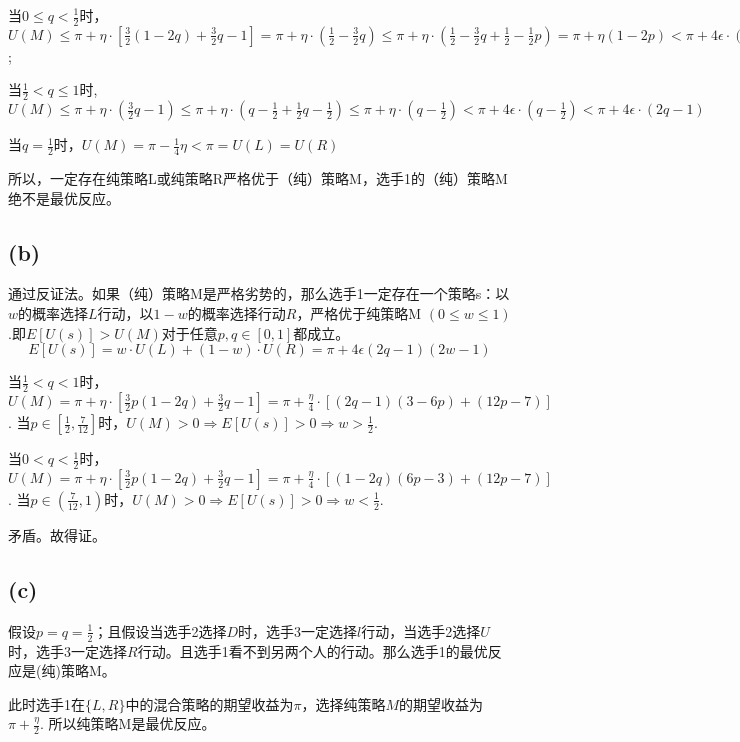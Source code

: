 \documentclass[11pt,fleqn]{article}
\begin{document}
		当$0\leq q < \frac{1}{2} $时，$U(M) \leq \pi + \eta \cdot [ \frac{3}{2}(1-2q)+\frac{3}{2}q-1 ]= \pi + \eta \cdot (\frac{1}{2} - \frac{3}{2}q)\leq \pi + \eta \cdot (\frac{1}{2} - \frac{3}{2}q + \frac{1}{2} - \frac{1}{2}p) = \pi + \eta (1-2p) < \pi + 4\epsilon \cdot (1-2q) = U(R) $; 

		当$ \frac{1}{2} < q \leq 1$时, $U(M) \leq \pi + \eta \cdot (\frac{3}{2}q -1) \leq \pi + \eta \cdot (q-\frac{1}{2} + \frac{1}{2}q-\frac{1}{2}) \leq \pi + \eta \cdot (q-\frac{1}{2}) 
		< \pi + 4\epsilon \cdot (q-\frac{1}{2})
		< \pi + 4\epsilon \cdot (2q-1)$

		当$q=\frac{1}{2}$时，$U(M) = \pi - \frac{1}{4}\eta < \pi = U(L)=U(R) $

		所以，一定存在纯策略L或纯策略R严格优于（纯）策略M，选手1的（纯）策略M绝不是最优反应。
	\subsection*{(b)}
		通过反证法。如果（纯）策略M是严格劣势的，那么选手1一定存在一个策略s：以$w$的概率选择$L$行动，以$1-w$的概率选择行动$R$，严格优于纯策略M $(0\leq w \leq 1)$.即$E[U(s)] > U(M) $对于任意$p,q \in [0,1]$都成立。
		\begin{displaymath}
			E[U(s)]= w\cdot U(L)+ (1-w)\cdot U(R) = \pi + 4\epsilon(2q-1)(2w-1)
		\end{displaymath}

		当$\frac{1}{2} < q < 1$时，$U(M) 
		= \pi + \eta\cdot [\frac{3}{2}p(1-2q)+\frac{3}{2}q-1 ] 
		= \pi + \frac{\eta}{4} \cdot [(2q-1)(3-6p)+(12p-7)] $. \quad
		当$p \in [\frac{1}{2}, \frac{7}{12}]$时，$U(M)>0 \Rightarrow  E[U(s)]>0  \Rightarrow w > \frac{1}{2}$.

		当$0<q < \frac{1}{2}  $时，$U(M) 
		= \pi + \eta\cdot [\frac{3}{2}p(1-2q)+\frac{3}{2}q-1 ]
		= \pi + \frac{\eta}{4} \cdot [(1-2q)(6p-3)+(12p-7)] $. \quad
		当$p \in (\frac{7}{12},1 ) $时，$U(M)>0 \Rightarrow E[U(s)] > 0 \Rightarrow w < \frac{1}{2} $.

		矛盾。故得证。
	\subsection*{(c)}
	假设$p=q=\frac{1}{2} $；且假设当选手2选择$D$时，选手3一定选择$l$行动，当选手2选择$U$时，选手3一定选择$R$行动。且选手1看不到另两个人的行动。那么选手1的最优反应是(纯)策略M。

	此时选手1在$\{L,R \}$中的混合策略的期望收益为$\pi$，选择纯策略$M$的期望收益为$\pi+\frac{\eta}{2} $. 所以纯策略M是最优反应。
	
\end{document}
